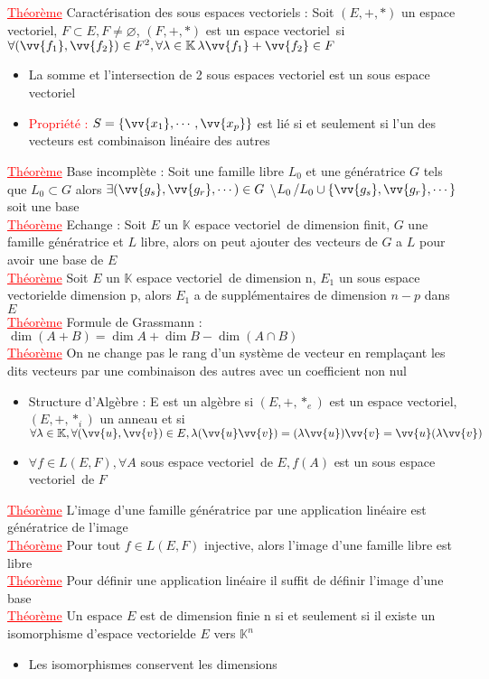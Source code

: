 \documentclass[a4paper, 11pts, french]{article}
\newcommand{\K}{\mathbb{K}}
\newcommand{\ev}{espace vectoriel}
\newcommand{\la}{\lambda}
\newcommand{\thm}{\textcolor{red}{\underline{Théorème} }}
\newcommand{\ppt}{\textcolor{red}{Propriété : }}
\newcommand{\acc}[1]{\left\{ #1 \right\}}
\begin{document}
	\thm Caractérisation des sous espaces vectoriels : Soit $(E,+,*)$ un \ev, $F \subset E, F \neq \varnothing$, $(F,+,*)$ est un \ev \, si $\forall(\vv{f_1},\vv{f_2}) \in F^2, \forall \la \in \K \, \la \vv{f_1}+\vv{f_2} \in F$
	\begin{itemize}
	  \item La somme et l'intersection de 2 sous espaces vectoriel est un sous espace vectoriel
	  \item \ppt $S=\acc{\vv{x_1},\cdots,\vv{x_p}}$ est lié si et seulement si l'un des vecteurs est combinaison linéaire des autres
	\end{itemize}
	 \thm Base incomplète : Soit une famille libre $L_0$ et une génératrice $G$ tels que $L_0 \subset G$ alors $\exists (\vv{g_s},\vv{g_r},\cdots) \in G$ \textbackslash $L_0 \, /  L_0 \cup \acc{\vv{g_s},\vv{g_r},\cdots}$ soit une base \\
	 \thm Echange : Soit $E$ un $\K$ \ev \, de dimension finit, $G$ une famille génératrice et $L$ libre, alors on peut ajouter des vecteurs de $G$ a $L$ pour avoir une base de $E$ \\
	 \thm Soit $E$ un $\K$ \ev \, de dimension n, $E_1$ un sous \ev de dimension p, alors $E_1$ a de supplémentaires de dimension $n-p$ dans $E$\\
	 \thm Formule de Grassmann : $\dim(A+B)=\dim A + \dim B - \dim(A\cap B)$ \\
	 \thm On ne change pas le rang d'un système de vecteur en remplaçant les dits vecteurs par une combinaison des autres avec un coefficient non nul
	\begin{itemize}
	  \item Structure d'Algèbre : E est un algèbre si $(E,+,*_e)$ est un \ev, $(E,+,*_i)$ un anneau et si $\forall \la \in \K,\forall (\vv{u},\vv{v}) \in E, \la(\vv{u}\vv{v})=(\la\vv{u})\vv{v}=\vv{u}(\la \vv{v})$
	  \item $\forall f \in L(E,F), \forall A$ sous \ev \, de $E, f(A)$ est un sous \ev \, de $F$ 
	\end{itemize}
	 \thm L'image d'une famille génératrice par une application linéaire est génératrice de l'image \\
	 \thm Pour tout $f \in L(E,F)$ injective, alors l'image d'une famille libre est libre \\
	 \thm Pour définir une application linéaire il suffit de définir l'image d'une base \\
	 \thm Un espace $E$ est de dimension finie n si et seulement si il existe un isomorphisme d'\ev de $E$ vers $\K^n$
	\begin{itemize}
	  \item Les isomorphismes conservent les dimensions
	\end{itemize}
\end{document}
